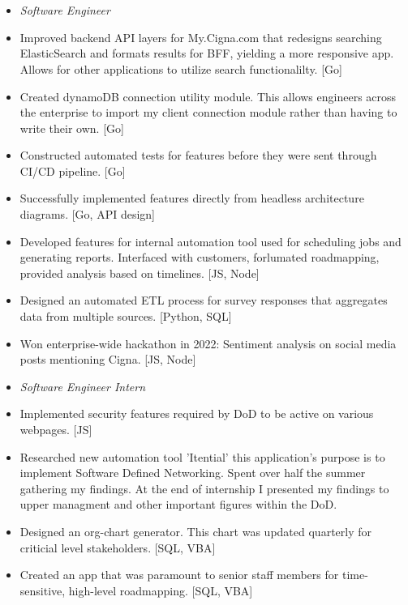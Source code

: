 \documentclass{article}
\begin{document}
\section{\\}
\color{black}
\begin{itemize}
\subsection{\large Cigna\hfill\mdseries July 2021 - Present}

 \item[] \textit{Software Engineer } %

\item Improved backend API layers for My.Cigna.com that redesigns searching ElasticSearch and formats results for BFF, yielding a more responsive app. Allows for other applications to utilize search functionalilty. [Go]
\item Created dynamoDB connection utility module. This allows engineers across the enterprise to import my client connection module rather than having to write their own. [Go]
\item Constructed automated tests for features before they were sent through CI/CD pipeline. [Go]
\item Successfully implemented features directly from headless architecture diagrams. [Go, API design]
\item Developed features for internal automation tool used for scheduling jobs and generating reports. Interfaced with customers, forlumated roadmapping,  provided analysis based on timelines. [JS, Node]
\item Designed an automated ETL process for survey responses that aggregates data from multiple sources. [Python, SQL]
\item Won enterprise-wide hackathon in 2022: Sentiment analysis on social media posts mentioning Cigna. [JS, Node]
\end{itemize}
\begin{itemize}
\subsection{\\\large Leidos\hfill\mdseries Summer 2019/2020}
\item[] \textit{Software Engineer Intern } %
\item Implemented security features required by DoD to be active on various webpages. [JS]
\item Researched new automation tool 'Itential' this application's purpose is to implement Software Defined Networking. Spent over half the summer gathering my findings. At the end of internship I presented my findings to upper managment and other important figures within the DoD.
\item Designed an org-chart generator. This chart was updated quarterly for criticial level stakeholders. [SQL, VBA]
\item Created an app that was paramount to senior staff members for time-sensitive, high-level roadmapping. [SQL, VBA]
\end{itemize}
\end{document}
